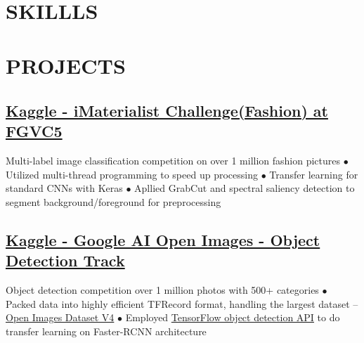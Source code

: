 \documentclass[11pt,a4paper]{moderncv}
\title{  }
\begin{document}
\maketitle
\vspace*{-11mm}

\section{SKILLLS}
\vspace{-0.75\baselineskip}

\section{PROJECTS}
\subsection{\href{https://www.kaggle.com/c/imaterialist-challenge-fashion-2018}{\small Kaggle - iMaterialist Challenge(Fashion) at FGVC5}}
{\footnotesize{ Multi-label image classification competition on over 1 million fashion pictures
\newline $\bullet$ Utilized multi-thread programming to speed up processing
\newline $\bullet$ Transfer learning for standard CNNs with Keras
\newline $\bullet$ Apllied GrabCut and spectral saliency detection to segment background/foreground for preprocessing}}

\subsection{\href{https://www.kaggle.com/c/google-ai-open-images-object-detection-track}{\small Kaggle - Google AI Open Images - Object Detection Track}}
{\footnotesize{ Object detection competition over 1 million photos with 500+ categories
\newline $\bullet$ Packed data into highly efficient TFRecord format, handling the largest dataset -- \href{https://storage.googleapis.com/openimages/web/index.html}{Open Images Dataset V4}  
\newline $\bullet$ Employed \href{https://github.com/tensorflow/models/tree/master/research/object_detection}{TensorFlow object detection API} to do transfer learning on Faster-RCNN architecture}}
\end{document}
